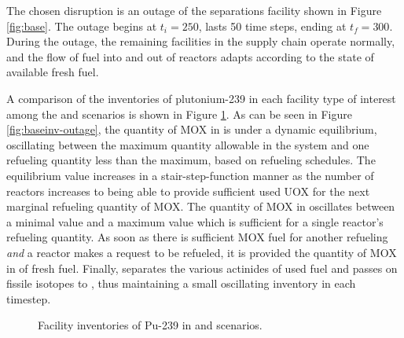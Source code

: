 The chosen disruption is an outage of the separations facility shown in Figure
\ref{fig:base}. The outage begins at $t_i = 250$, lasts 50 time steps, ending at
$t_f = 300$. During the outage, the remaining facilities in the supply chain
operate normally, and the flow of fuel into and out of reactors adapts according
to the state of available fresh fuel.

A comparison of the inventories of plutonium-239 in each facility type of
interest among the \basecase and \outage scenarios is shown in Figure
\ref{fig:outage}. As can be seen in Figure \ref{fig:baseinv-outage}, the quantity of
MOX in \reactors is under a dynamic equilibrium, oscillating between the
maximum quantity allowable in the system and one refueling quantity less than the
maximum, based on refueling schedules. The equilibrium value increases in a
stair-step-function manner as the number of reactors increases to being able to
provide sufficient used UOX for the next marginal refueling quantity of MOX. The
quantity of MOX in \fabrication oscillates between a minimal value and a maximum
value which is sufficient for a single reactor's refueling quantity. As soon as
there is sufficient MOX fuel for another refueling \textit{and} a reactor makes
a request to be refueled, it is provided the quantity of MOX in of fresh
fuel. Finally, \separations separates the various actinides of used fuel and
passes on fissile isotopes to \fabrication, thus maintaining a small oscillating
inventory in each timestep.

\begin{figure}
  \centering
  \begin{minipage}{0.67\textwidth}
    \centering 
    \vfill 
  \end{minipage}%
  \begin{minipage}{0.33\textwidth}
    \centering
  \end{minipage}%
  \caption[]{
    \label{fig:outage}
    Facility inventories of Pu-239 in \basecase and \outage scenarios.}
\end{figure}

